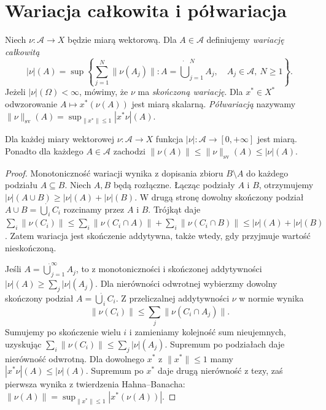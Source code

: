 \section{Wariacja całkowita i półwariacja}
\label{sec:vector-variation-30}
\begin{definicja}
\label{def:vector-variation-30}
Niech $\nu:\mathcal A\to X$ będzie miarą wektorową.
Dla $A\in\mathcal A$ definiujemy \emph{wariację całkowitą}
\[
 |\nu|(A)=\sup\left\{\sum_{j=1}^{N}\|\nu(A_j)\|:
 A=\dot\bigcup_{j=1}^{N}A_j,\quad A_j\in\mathcal A,\ N\ge1\right\}.
\]
Jeżeli $|\nu|(\Omega)<\infty$, mówimy, że $\nu$ ma
\emph{skończoną wariację}. Dla $x^*\in X^*$ odwzorowanie
$A\mapsto x^*(\nu(A))$ jest miarą skalarną.
\emph{Półwariacją} nazywamy
$\|\nu\|_{\mathrm{sv}}(A)
=\sup_{\|x^*\|\le1}|x^*\nu|(A)$.
\end{definicja}

\begin{twierdzenie}
\label{thm:vector-variation-measure-30}
Dla każdej miary wektorowej $\nu:\mathcal A\to X$
funkcja $|\nu|:\mathcal A\to[0,+\infty]$ jest miarą.
Ponadto dla każdego $A\in\mathcal A$ zachodzi
$\|\nu(A)\|\le\|\nu\|_{\mathrm{sv}}(A)\le|\nu|(A)$.
\end{twierdzenie}
\begin{proof}
Monotoniczność wariacji wynika z dopisania zbioru
$B\setminus A$ do każdego podziału $A\subseteq B$.
Niech $A,B$ będą rozłączne. Łącząc podziały $A$ i $B$,
otrzymujemy $|\nu|(A\cup B)\ge|\nu|(A)+|\nu|(B)$.
W drugą stronę dowolny skończony podział
$A\cup B=\dot\bigcup_i C_i$ rozcinamy przez $A$ i $B$.
Trójkąt daje
$\sum_i\|\nu(C_i)\|
\le\sum_i\|\nu(C_i\cap A)\|+\sum_i\|\nu(C_i\cap B)\|
\le|\nu|(A)+|\nu|(B)$.
Zatem wariacja jest skończenie addytywna, także wtedy,
gdy przyjmuje wartość nieskończoną.

Jeśli $A=\dot\bigcup_{j=1}^{\infty}A_j$,
to z monotoniczności i skończonej addytywności
$|\nu|(A)\ge\sum_j|\nu|(A_j)$.
Dla nierówności odwrotnej wybierzmy dowolny
skończony podział $A=\dot\bigcup_i C_i$.
Z przeliczalnej addytywności $\nu$ w normie wynika
\[
 \|\nu(C_i)\|\le\sum_j\|\nu(C_i\cap A_j)\|.
\]
Sumujemy po skończenie wielu $i$ i zamieniamy kolejność
sum nieujemnych, uzyskując
$\sum_i\|\nu(C_i)\|\le\sum_j|\nu|(A_j)$.
Supremum po podziałach daje nierówność odwrotną.
Dla dowolnego $x^*$ z $\|x^*\|\le1$ mamy
$|x^*\nu|(A)\le|\nu|(A)$. Supremum po $x^*$
daje drugą nierówność z tezy, zaś pierwsza wynika
z twierdzenia Hahna--Banacha:
$\|\nu(A)\|=\sup_{\|x^*\|\le1}|x^*(\nu(A))|$.
\end{proof}

